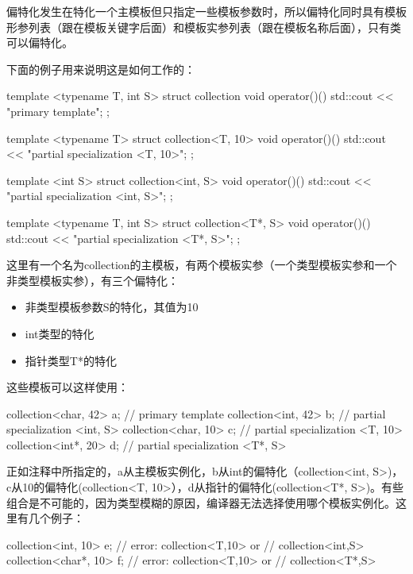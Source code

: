偏特化发生在特化一个主模板但只指定一些模板参数时，所以偏特化同时具有模板形参列表（跟在模板关键字后面）和模板实参列表（跟在模板名称后面），只有类可以偏特化。

下面的例子用来说明这是如何工作的：

\begin{cpp}
template <typename T, int S>
struct collection
{
	void operator()()
	{ std::cout << "primary template\n"; }
};

template <typename T>
struct collection<T, 10>
{
	void operator()()
	{ std::cout << "partial specialization <T, 10>\n"; }
};

template <int S>
struct collection<int, S>
{
	void operator()()
	{ std::cout << "partial specialization <int, S>\n"; }
};

template <typename T, int S>
struct collection<T*, S>
{
	void operator()()
	{ std::cout << "partial specialization <T*, S>\n"; }
};
\end{cpp}

这里有一个名为collection的主模板，有两个模板实参（一个类型模板实参和一个非类型模板实参），有三个偏特化：

\begin{itemize}
\item 
非类型模板参数S的特化，其值为10

\item 
int类型的特化

\item 
指针类型T*的特化
\end{itemize}

这些模板可以这样使用：

\begin{cpp}
collection<char, 42> a; // primary template
collection<int, 42> b; // partial specialization <int, S>
collection<char, 10> c; // partial specialization <T, 10>
collection<int*, 20> d; // partial specialization <T*, S>
\end{cpp}

正如注释中所指定的，a从主模板实例化，b从int的偏特化（collection<int, S>)， c从10的偏特化(collection<T, 10>），d从指针的偏特化(collection<T*, S>)。有些组合是不可能的，因为类型模糊的原因，编译器无法选择使用哪个模板实例化。这里有几个例子：

\begin{cpp}
collection<int, 10> e; // error: collection<T,10> or
                       // collection<int,S>
collection<char*, 10> f; // error: collection<T,10> or
                         // collection<T*,S>
\end{cpp}

